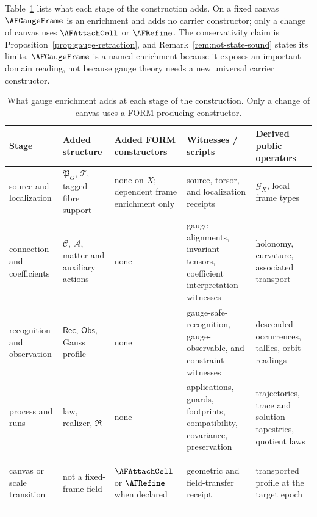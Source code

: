Table~\ref{tab:gauge-enrichment-stages} lists what each stage of the
construction adds.  On a fixed canvas $\AFGaugeFrame$ is an enrichment and
adds no carrier constructor; only a change of canvas uses $\AFAttachCell$ or
$\AFRefine$.  The conservativity claim is Proposition~\ref{prop:gauge-retraction},
and Remark~\ref{rem:not-state-sound} states its limits.  $\AFGaugeFrame$ is a
named enrichment because it exposes an important domain reading, not because
gauge theory needs a new universal carrier constructor.

\begin{table}[!tbp]
\centering
\footnotesize
\renewcommand{\arraystretch}{1.12}
\begin{tabularx}{\textwidth}{@{}>{\bfseries\raggedright\arraybackslash}p{}
  >{\raggedright\arraybackslash}X>{\raggedright\arraybackslash}X
  >{\raggedright\arraybackslash}X>{\raggedright\arraybackslash}X@{}}
\toprule
Stage & Added structure & Added FORM constructors & Witnesses / scripts & Derived public operators\\
\midrule
source and localization & $\mathfrak P_G$, $\mathcal T$, tagged fibre support & none on $X$; dependent frame enrichment only & source, torsor, and localization receipts & $\mathscr G_X$, local frame types\\
connection and coefficients & $\mathcal C$, $\mathcal A$, matter and auxiliary actions & none & gauge alignments, invariant tensors, coefficient interpretation witnesses & holonomy, curvature, associated transport\\
recognition and observation & $\mathsf{Rec}$, $\mathsf{Obs}$, Gauss profile & none & gauge-safe-recognition, gauge-observable, and constraint witnesses & descended occurrences, tallies, orbit readings\\
process and runs & law, realizer, $\mathfrak R$ & none & applications, guards, footprints, compatibility, covariance, preservation & trajectories, trace and solution tapestries, quotient laws\\
canvas or scale transition & not a fixed-frame field & $\AFAttachCell$ or $\AFRefine$ when declared & geometric and field-transfer receipt & transported profile at the target epoch\\
\bottomrule
\end{tabularx}
\caption{What gauge enrichment adds at each stage of the construction.  Only
a change of canvas uses a FORM-producing constructor.}
\label{tab:gauge-enrichment-stages}
\end{table}

